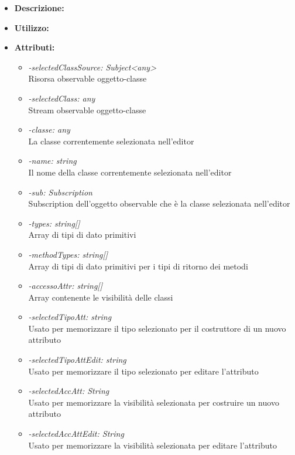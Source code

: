 \begin{itemize}
	\item \textbf{Descrizione:}\\
	
	\item \textbf{Utilizzo:}\\
	
	\item \textbf{Attributi:}
		\begin{itemize}
			\item \emph{-selectedClassSource: Subject<any>}\\
			Risorsa observable oggetto-classe
			\item \emph{-selectedClass: any}\\
			Stream observable oggetto-classe
			\item \emph{-classe: any}\\
			La classe correntemente selezionata nell'editor
			\item \emph{-name: string}\\
			Il nome della classe correntemente selezionata nell'editor
			\item \emph{-sub: Subscription}\\
			Subscription dell'oggetto observable che è la classe selezionata nell'editor
			\item \emph{-types: string[]}\\
			Array di tipi di dato primitivi
			\item \emph{-methodTypes: string[]}\\
			Array di tipi di dato primitivi per i tipi di ritorno dei metodi
			\item \emph{-accessoAttr: string[]}\\
			Array contenente le visibilità delle classi
			\item \emph{-selectedTipoAtt: string}\\
			Usato per memorizzare il tipo selezionato per il costruttore di un nuovo attributo
			\item \emph{-selectedTipoAttEdit: string}\\
			Usato per memorizzare il tipo selezionato per editare l'attributo
			\item \emph{-selectedAccAtt: String}\\
			Usato per memorizzare la visibilità selezionata per costruire un nuovo attributo
			\item \emph{-selectedAccAttEdit: String}\\
			Usato per memorizzare la visibilità selezionata per editare l'attributo

\end{itemize}
\end{itemize}
